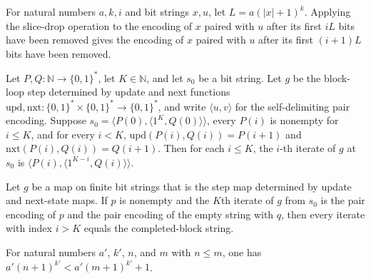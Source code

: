 \begin{theorem}
\label{Complexity.BlockLoop.sliceDropAt_pairEncode_drop}
\leanok
{}
For natural numbers $a,k,i$ and bit strings $x,u$, let $L=a(|x|+1)^k$. Applying the
slice-drop operation to the encoding of $x$ paired with $u$ after its first $iL$ bits
have been removed gives the encoding of $x$ paired with $u$ after its first $(i+1)L$
bits have been removed.
\end{theorem}

\begin{theorem}
\label{Complexity.BlockLoop.orbit}
\leanok
{}
Let $P,Q:\mathbb{N}\to\{0,1\}^*$, let $K\in\mathbb{N}$, and let $s_0$ be a bit string.
Let $g$ be the block-loop step determined by update and next functions
$\mathrm{upd},\mathrm{nxt}:\{0,1\}^*\times\{0,1\}^*\to\{0,1\}^*$, and write $\langle
u,v\rangle$ for the self-delimiting pair encoding. Suppose $s_0=\langle P(0),\langle
1^K,Q(0)\rangle\rangle$, every $P(i)$ is nonempty for $i\le K$, and for every $i<K$,
$\mathrm{upd}(P(i),Q(i))=P(i+1)$ and $\mathrm{nxt}(P(i),Q(i))=Q(i+1)$. Then for each
$i\le K$, the $i$-th iterate of $g$ at $s_0$ is $\langle P(i),\langle
1^{K-i},Q(i)\rangle\rangle$.
\end{theorem}

\begin{theorem}
\label{Complexity.BlockLoop.iterate_done}
\leanok
{}
Let $g$ be a map on finite bit strings that is the step map determined by update and
next-state maps. If $p$ is nonempty and the $K$th iterate of $g$ from $s_0$ is the pair
encoding of $p$ and the pair encoding of the empty string with $q$, then every iterate
with index $i>K$ equals the completed-block string.
\end{theorem}

\begin{theorem}
\label{Complexity.BlockLoop.lt_polyBudget_of_le}
\leanok
{}
For natural numbers $a'$, $k'$, $n$, and $m$ with $n\le m$, one has
$a'(n+1)^{k'}<a'(m+1)^{k'}+1$.
\end{theorem}


